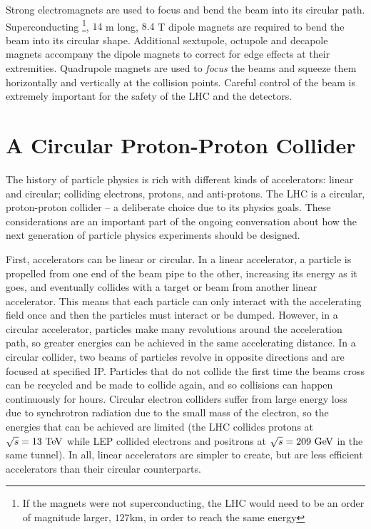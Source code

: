 Strong electromagnets are used to focus and bend the beam into its circular path. Superconducting \footnote{If the magnets were not superconducting, the \ac{LHC} would need to be an order of magnitude larger, $127 \textrm{km}$, in order to reach the same energy}, $14$ m long, $8.4$ T dipole magnets are required to bend the beam into its circular shape. Additional sextupole, octupole and decapole magnets accompany the dipole magnets to  correct for edge effects at their extremities. Quadrupole magnets are used to \emph{focus} the beams and squeeze them horizontally and vertically at the collision points. Careful control of the beam is extremely important for the safety of the \ac{LHC} and the detectors. 


\section{A Circular Proton-Proton Collider}

The history of particle physics is rich with different kinds of accelerators: linear and circular; colliding electrons, protons, and anti-protons. The \ac{LHC} is a circular, proton-proton collider -- a deliberate choice due to its physics goals. These considerations are an important part of the ongoing conversation about how the next generation of particle physics experiments should be designed. 

First, accelerators can be linear or circular. In a linear accelerator, a particle is propelled from one end of the beam pipe to the other, increasing its energy as it goes, and eventually collides with a target or beam from another linear accelerator. This means that each particle can only interact with the accelerating field once and then the particles must interact or be dumped. However, in a circular accelerator, particles make many revolutions around the acceleration path, so greater energies can be achieved in the same accelerating distance. In a circular collider, two beams of particles revolve in opposite directions and are focused at specified \ac{IP}. Particles that do not collide the first time the beams cross can be recycled and be made to collide again, and so collisions can happen continuously for hours. Circular electron colliders suffer from large energy loss due to synchrotron radiation due to the small mass of the electron, so the energies that can be achieved are limited (the \ac{LHC} collides protons at $\sqrt{s} = 13 \TeV$ while \ac{LEP} collided electrons and positrons at $\sqrt{s} = 209 \GeV$ in the same tunnel). In all, linear accelerators are simpler to create, but are less efficient accelerators than their circular counterparts. 

